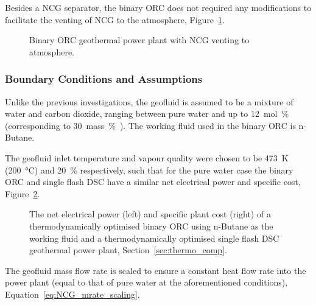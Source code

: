         Besides a \ac{NCG} separator, the binary \ac{ORC} does not required any modifications to facilitate the venting of \ac{NCG} to the atmosphere, Figure~\ref{fig:prosim_NCG_ventingORC}.

        \begin{figure}[H]
            \centering
            
            \caption{Binary \ac{ORC} geothermal power plant with \ac{NCG} venting to atmosphere.}
            \label{fig:prosim_NCG_ventingORC}
        \end{figure}

    \subsubsection{Boundary Conditions and Assumptions}
        Unlike the previous investigations, the geofluid is assumed to be a mixture of water and carbon dioxide, ranging between pure water and up to \qty{12}{\mol\percent{}} (corresponding to \qty{30}{mass\percent{}}). The working fluid used in the binary \ac{ORC} is n-Butane.

        The geofluid inlet temperature and vapour quality were chosen to be \qty{473}{\K} (\qty{200}{\degreeCelsius}) and \qty{20}{\percent} respectively, such that for the pure water case the binary \ac{ORC} and single flash \ac{DSC} have a similar net electrical power and specific cost, Figure~\ref{fig:prosim_NCG_nButane_Wnet_specCost}. 

        \begin{figure}[H]
            \centering
            
            \caption[The net electrical power and specific plant cost of a thermodynamically optimised binary \ac{ORC} using n-Butane as the working fluid and a single flash \ac{DSC} geothermal power plant.]{The net electrical power (left) and specific plant cost (right) of a thermodynamically optimised binary \ac{ORC} using n-Butane as the working fluid and a thermodynamically optimised single flash \ac{DSC} geothermal power plant, Section~\ref{sec:thermo_comp}.}
            \label{fig:prosim_NCG_nButane_Wnet_specCost}
        \end{figure}

        The geofluid mass flow rate is scaled to ensure a constant heat flow rate into the power plant (equal to that of pure water at the aforementioned conditions), Equation~\ref{eq:NCG_mrate_scaling}.

